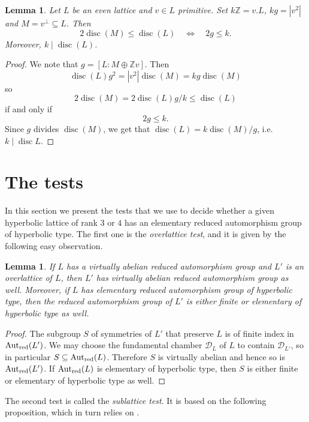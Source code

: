 \documentclass[11pt,letterpaper]{amsart}
\DeclareMathOperator{\Aut}{Aut}
\DeclareMathOperator{\disc}{disc}
\newcommand{\ZZ}{\mathbb{Z}}
\newcommand{\AutredL}{\Aut_{\rm red}(L)}
\newcommand{\AutredLpr}{\Aut_{\rm red}(L')}
\newtheorem{lemma}[theorem]{Lemma}
\theoremstyle{definition}
\theoremstyle{remark}
\begin{document}
\begin{lemma}\label{lem:easy_vectors}
 Let $L$ be an even lattice and $v \in L$ primitive. Set $k \ZZ = v.L$, $kg=|v^2|$ and $M=v^\perp \subseteq L$.
 Then 
 \[2\disc(M) \leq \disc(L) \quad \Leftrightarrow \quad 2g \leq k.\]
 Moreover, $k \mid \disc(L)$. 
\end{lemma}
\begin{proof}
We note that $g=[L:M \oplus \ZZ v]$. Then
\[\disc(L) g^2 = |v^2|\disc(M)=kg \disc(M)\]
so 
\[2\disc(M) = 2 \disc(L)g/k \leq \disc(L)\]
if and only if
\[2 g \leq k.\]
Since $g$ divides $\disc(M)$, we get that $\disc(L)=k \disc(M)/g$, i.e. $k \mid \disc L$. 
\end{proof}



\section{The tests} \label{sec:tests}

In this section we present the tests that we use to decide whether a given hyperbolic lattice of rank $3$ or $4$ has an elementary reduced automorphism group of hyperbolic type. The first one is the \emph{overlattice test}, and it is given by the following easy observation.

\begin{lemma}\label{lem:overlattice}
If $L$ has a virtually abelian reduced automorphism group and $L'$ is an overlattice of $L$, then $L'$ has virtually abelian reduced automorphism group as well.
Moreover, if $L$ has elementary reduced automorphism group of hyperbolic type, then the reduced automorphism group of $L'$ is either finite or elementary of hyperbolic type as well.
\end{lemma}
\begin{proof}
The subgroup $S$ of symmetries of $L'$ that preserve $L$ is of finite index in $\AutredLpr$.
We may choose the fundamental chamber $\mathcal{D}_L$ of $L$ to contain $\mathcal{D}_{L'}$, so in particular $S \subseteq \AutredL$. Therefore $S$ is virtually abelian and hence so is $\AutredLpr$.
If $\AutredL$ is elementary of hyperbolic type, then $S$ is either finite or elementary of hyperbolic type as well.
\end{proof}

The second test is called the \emph{sublattice test}. It is based on the following proposition, which in turn relies on .
\end{document}
